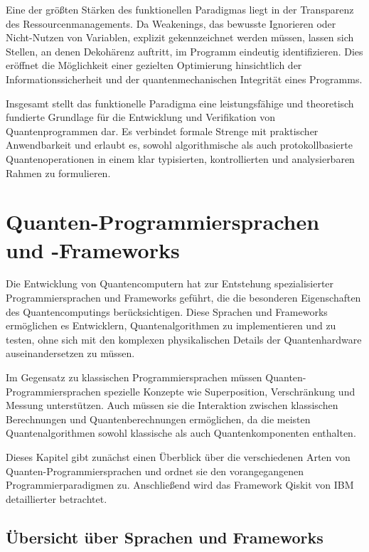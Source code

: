 Eine der größten Stärken des funktionellen Paradigmas liegt in der Transparenz des Ressourcenmanagements. Da Weakenings, das bewusste Ignorieren oder Nicht-Nutzen von Variablen, explizit gekennzeichnet werden müssen, lassen sich Stellen, an denen Dekohärenz auftritt, im Programm eindeutig identifizieren. Dies eröffnet die Möglichkeit einer gezielten Optimierung hinsichtlich der Informationssicherheit und der quantenmechanischen Integrität eines Programms.

Insgesamt stellt das funktionelle Paradigma eine leistungsfähige und theoretisch fundierte Grundlage für die Entwicklung und Verifikation von Quantenprogrammen dar. Es verbindet formale Strenge mit praktischer Anwendbarkeit und erlaubt es, sowohl algorithmische als auch protokollbasierte Quantenoperationen in einem klar typisierten, kontrollierten und analysierbaren Rahmen zu formulieren. \autocite{altenkirchFunctionalQuantumProgramming2005}

\section{Quanten-Programmiersprachen und -Frameworks}
\label{sec:programming-languages}

Die Entwicklung von Quantencomputern hat zur Entstehung spezialisierter Programmiersprachen und Frameworks geführt, die die besonderen Eigenschaften des Quantencomputings berücksichtigen. Diese Sprachen und Frameworks ermöglichen es Entwicklern, Quantenalgorithmen zu implementieren und zu testen, ohne sich mit den komplexen physikalischen Details der Quantenhardware auseinandersetzen zu müssen.

Im Gegensatz zu klassischen Programmiersprachen müssen Quanten-Programmier\-sprachen spezielle Konzepte wie Superposition, Verschränkung und Messung unterstützen. Auch müssen sie die Interaktion zwischen klassischen Berechnungen und Quantenberechnungen ermöglichen, da die meisten Quantenalgorithmen sowohl klassische als auch Quantenkomponenten enthalten.

Dieses Kapitel gibt zunächst einen Überblick über die verschiedenen Arten von Quanten-Programmiersprachen und ordnet sie den vorangegangenen Programmierparadigmen zu. Anschließend wird das Framework Qiskit von IBM detaillierter betrachtet.

\subsection{Übersicht über Sprachen und Frameworks}
\label{sec:lang-frameworks}

